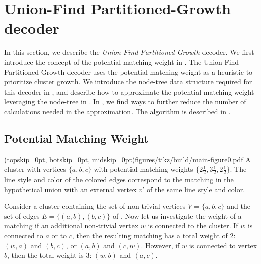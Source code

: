 \section{Union-Find Partitioned-Growth decoder}\label{sec:ufbb}
In this section, we describe the \emph{Union-Find Partitioned-Growth} decoder. We first introduce the concept of the potential matching weight in . The Union-Find Partitioned-Growth decoder uses the potential matching weight as a heuristic to prioritize cluster growth. We introduce the node-tree data structure required for this decoder in , and describe how to approximate the potential matching weight leveraging the node-tree in . In , we find ways to further reduce the number of calculations needed in the approximation. The algorithm is described in . 

\subsection{Potential Matching Weight}\label{sec:matchingweight}

\Figure[htb](topskip=0pt, botskip=0pt, midskip=0pt){figures/tikz/build/main-figure0.pdf}{
    A cluster with vertices $\{a,b,c\}$ with potential matching weights $\{2\frac{1}{2}, 3\frac{1}{2}, 2\frac{1}{2}\}$. The line style and color of the colored edges correspond to the matching in the hypothetical union with an external vertex $v'$ of the same line style and color.\label{fig0}}


Consider a cluster containing the set of non-trivial vertices $V=\{a,b,c\}$ and the set of edges $E=\{(a,b), (b, c)\}$ of . Now let us investigate the weight of a matching if an additional non-trivial vertex $w$ is connected to the cluster. If $w$ is connected to $a$ or to $c$, then the resulting matching has a total weight of 2: $(w,a)$ and $(b,c)$, or $(a,b)$ and $(c,w)$. However, if $w$ is connected to vertex $b$, then the total weight is 3: $(w, b)$ and $(a, c)$. %

